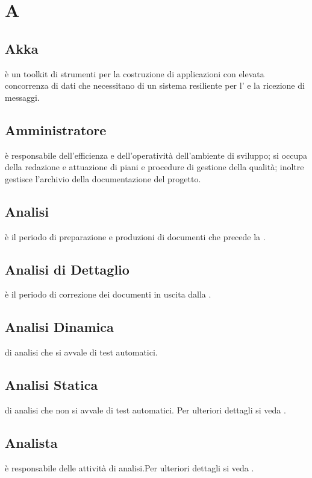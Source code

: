 \documentclass[12pt,a4paper]{article}
\begin{document}
\newpage
\tableofcontents
\newpage

\section{A}

\subsection{Akka} 
è un toolkit di strumenti per la costruzione di applicazioni con elevata concorrenza di dati che necessitano di un sistema resiliente per l' e la ricezione di messaggi.

\subsection{Amministratore} 
è responsabile dell'efficienza e dell'operatività dell'ambiente di sviluppo; si occupa della redazione e attuazione di piani e procedure di gestione della qualità; inoltre gestisce l'archivio della documentazione del progetto.

\subsection{Analisi}
è il periodo di preparazione e produzioni di documenti che precede la \RR.

\subsection{Analisi di Dettaglio}
è il periodo di correzione dei documenti in uscita dalla \RR.

\subsection{Analisi Dinamica}
  di analisi che si avvale di test automatici.

\subsection{Analisi Statica}
  di analisi che non si avvale di test automatici. Per ulteriori dettagli si veda \PdQ{}.

\subsection{Analista}
è responsabile delle attività di analisi.Per ulteriori dettagli si veda \PdQ{}.
\end{document}
